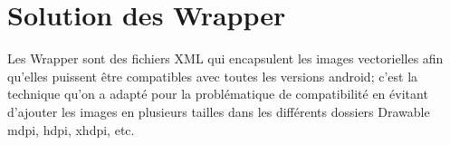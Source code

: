 \section{Solution des Wrapper}

Les Wrapper sont des fichiers XML qui encapsulent les images vectorielles afin qu’elles puissent être compatibles avec toutes les versions android; c’est la technique qu’on a adapté pour la problématique de compatibilité en évitant d’ajouter les images en  plusieurs tailles dans les différents  dossiers Drawable  mdpi, hdpi, xhdpi, etc.
 
